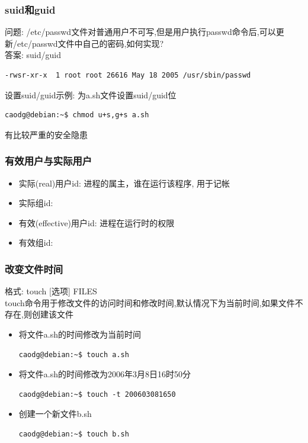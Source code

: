 \documentclass[compress]{beamer}
\begin{document}
\begin{frame}[containsverbatim]
\frametitle{suid和guid}

问题:
/etc/passwd文件对普通用户不可写,但是用户执行passwd命令后,可以更新/etc/passwd文件中自己的密码,如何实现?\\
答案: suid/guid

\begin{Verbatim}
-rwsr-xr-x  1 root root 26616 May 18 2005 /usr/sbin/passwd
\end{Verbatim}

设置suid/guid示例: 为a.sh文件设置suid/guid位\\
\begin{Verbatim}
caodg@debian:~$ chmod u+s,g+s a.sh
\end{Verbatim}
有比较严重的安全隐患
\end{frame}

\begin{frame}
\frametitle{有效用户与实际用户}

\begin{itemize}
\item 实际(real)用户id: 进程的属主，谁在运行该程序, 用于记帐
\item 实际组id: 
\item 有效(effective)用户id: 进程在运行时的权限
\item 有效组id: 
\end{itemize}
\end{frame}



\begin{frame}[containsverbatim]
\frametitle{改变文件时间}

格式: \alert{touch} [选项] FILES \\
\alert{touch}命令用于修改文件的访问时间和修改时间,默认情况下为当前时间,如果文件不存在,则创建该文件

\begin{itemize}
\item 将文件a.sh的时间修改为当前时间\\
\begin{Verbatim}
caodg@debian:~$ touch a.sh
\end{Verbatim}

\item 将文件a.sh的时间修改为2006年3月8日16时50分\\
\begin{Verbatim}
caodg@debian:~$ touch -t 200603081650
\end{Verbatim}

\item 创建一个新文件b.sh\\
\begin{Verbatim}
caodg@debian:~$ touch b.sh
\end{Verbatim}

\end{itemize}



\end{frame}
\end{document}
